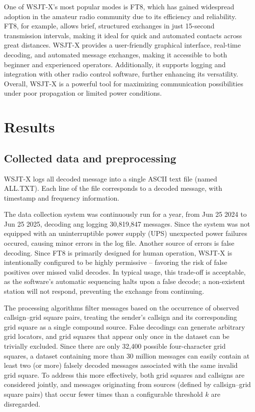 \documentclass[signals,article,submit,pdftex,moreauthors]{Definitions/mdpi}
\begin{document}
One of WSJT-X's most popular modes is FT8, which has gained widespread adoption
in the amateur radio community due to its efficiency and reliability. FT8, for
example, allows brief, structured exchanges in just 15-second transmission
intervals, making it ideal for quick and automated contacts across great
distances. WSJT-X provides a user-friendly graphical interface, real-time
decoding, and automated message exchanges, making it accessible to both
beginner and experienced operators. Additionally, it supports logging and
integration with other radio control software, further enhancing its
versatility. Overall, WSJT-X is a powerful tool for maximizing communication
possibilities under poor propagation or limited power conditions.

\section{Results}

\subsection{Collected data and preprocessing}

WSJT-X logs all decoded message into a single ASCII text file (named ALL.TXT). Each
line of the file corresponds to a decoded message, with timestamp and frequency information.

The data collection system was continuously run for a year, from Jun 25 2024 to Jun 25 2025,
decoding ang logging 30,819,847 messages. Since the system was not equipped with an
uninterruptible power supply (UPS) unexpected power failures occured, causing
minor errors in the log file.
Another source of errors is false decoding. Since FT8 is primarily designed for
human operation, WSJT-X is intentionally configured to be highly
permissive -- favoring the risk of false positives over missed valid decodes. In
typical usage, this trade-off is acceptable, as the software’s automatic
sequencing halts upon a false decode; a non-existent station will not respond,
preventing the exchange from continuing.

The processing algorithms filter messages based on the occurrence of observed
callsign–grid square pairs, treating the sender’s callsign and its
corresponding grid square as a single compound source. False decodings can
generate arbitrary grid locators, and grid squares that appear only once in the
dataset can be trivially excluded. Since there are only 32,400 possible
four-character grid squares, a dataset containing more than 30 million messages
can easily contain at least two (or more) falsely decoded messages
associated with the same invalid grid square. To address this more effectively,
both grid squares and callsigns are considered jointly, and messages
originating from sources (defined by callsign–grid square pairs) that occur
fewer times than a configurable threshold $k$ are disregarded.
\end{document}
